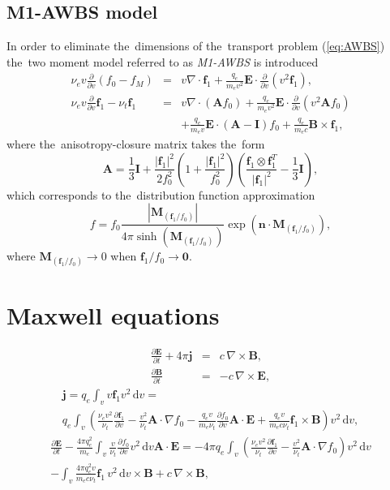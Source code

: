 \documentclass[preprint,12pt]{elsarticle}
\newcommand{\pdv}[2]{\frac{\partial{#1}}{\partial{#2}}}
\newcommand{\vect}[1]{\boldsymbol{#1}}
\newcommand{\matr}[1]{\mathbf{#1}}
\newcommand{\dI}{\text{d}}
\newcommand{\nue}{\nu_{e}}
\newcommand{\nutot}{\nu_{t}}
\newcommand{\vmag}{v}
\newcommand{\vn}{\vect{n}}
\newcommand{\E}{\vect{E}}
\newcommand{\B}{\vect{B}}
\newcommand{\qe}{q_e}
\newcommand{\me}{m_e}
\newcommand{\fM}{f_M}
\newcommand{\fzero}{f_0}
\newcommand{\fone}{\vect{f}_1}
\newcommand{\MI}{\matr{I}}
\newcommand{\MA}{\matr{A}}
\newcommand{\intv}{\int_{\vmag}}
\newcommand{\anisomega}{\fone/\fzero}
\newcommand{\acl}{\vect{M}_{\left(\anisomega\right)}}
\newcommand{\refeq}[1]{(\ref{#1})}
\newcounter{bla}
\begin{document}
\subsection{M1-AWBS model}
In order to eliminate the~dimensions of the~transport problem \refeq{eq:AWBS}
the~two moment model referred to as \textit{M1-AWBS} is introduced
\begin{eqnarray}
  \nue\vmag\pdv{}{\vmag}\left(\fzero - \fM \right) &=&
  \vmag\nabla\cdot\fone + \frac{\qe}{\me\vmag^2}\E\cdot\pdv{}{\vmag}
  \left( \vmag^2 \fone\right) , 
  \label{eq:M1f0}\\
  \nue\vmag\pdv{}{\vmag}\fone - \nutot\fone &=& 
  \vmag\nabla\cdot\left(\MA\fzero\right) + 
  \frac{\qe}{\me\vmag^2}\E\cdot\pdv{}{\vmag}
  \left( \vmag^2 \MA\fzero\right) \nonumber\\
  && + \frac{\qe}{\me\vmag}\E\cdot\left( \MA - \MI \right)\fzero +
  \frac{\qe}{\me c}\B\times\fone ,
  \label{eq:M1f1}
\end{eqnarray}
where the~anisotropy-closure matrix takes the~form
\begin{equation}
  \MA = \frac{1}{3}\MI + \frac{|\fone|^2}{2\fzero^2}
  \left( 1 + \frac{|\fone|^2}{\fzero^2} \right)
  \left( \frac{\fone\otimes\fone^T}{|\fone|^2} - \frac{1}{3}\MI\right) ,
\end{equation}
which corresponds to the~distribution function approximation
\begin{equation}
  f = \fzero \frac{\left|\acl\right|}{4\pi\sinh\left(\acl\right)}
  \exp\left(\vn\cdot\acl\right) ,
\end{equation}
where $\acl \rightarrow 0$ when $\anisomega \rightarrow \vect{0}$. 

\section{Maxwell equations}\label{sec:Efield}
\begin{eqnarray}
  \pdv{\E}{t} + 4\pi\vect{j} &=& c\, \nabla\times\B ,
  \label{eq:Ampere} \\
  \pdv{\B}{t} &=& -c\, \nabla\times\E ,
  \label{eq:Faraday}
\end{eqnarray}
\begin{multline}
  \vect{j} = \qe \intv\vmag\fone\vmag^2\, \dI\vmag = \\
  \qe \intv \left(\frac{\nue\vmag^2}{\nutot}\pdv{\fone}{\vmag}
  - \frac{\vmag^2}{\nutot}\MA\cdot\nabla\fzero - 
  \frac{\qe\vmag}{\me\nutot}\pdv{\fzero}{\vmag}\MA\cdot\E
   + \frac{\qe\vmag}{\me c\nutot}\fone\times\B\right) \vmag^2\, \dI\vmag ,
  \label{eq:current}
\end{multline}
\begin{multline}
  \pdv{\E}{t} - \frac{4\pi\qe^2}{\me}
  \intv\frac{\vmag}{\nutot} \pdv{\fzero}{\vmag}\vmag^2\, \dI\vmag \MA\cdot\E 
   = 
  - 4\pi\qe\intv\left( 
  \frac{\nue\vmag^2}{\nutot}\pdv{\fone}{\vmag}
  - \frac{\vmag^2}{\nutot}\MA\cdot\nabla\fzero\right)\vmag^2\, \dI\vmag  \\
  - \intv \frac{4\pi\qe^2\vmag}{\me c\nutot}\fone\, \vmag^2\, \dI\vmag \times\B 
  + c\, \nabla\times\B ,
  \label{eq:GeneralizedOhm} 
\end{multline}
\end{document}

